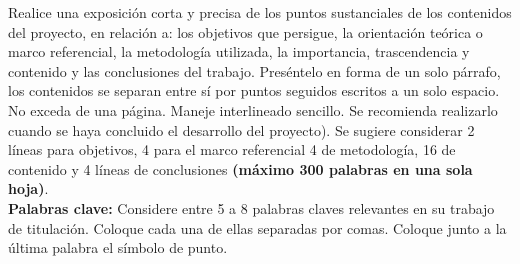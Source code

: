 \documentclass[12pt, a4paper, nofontenc, numbers=endperiod]{apa7}
\begin{document}
{			\setlength{\parindent}{0cm}\singlespacing Realice una exposición corta y precisa de los puntos sustanciales de los contenidos del proyecto, en relación a: los objetivos que persigue, la orientación teórica o marco referencial, la metodología utilizada, la importancia, trascendencia y contenido y las conclusiones del trabajo. Preséntelo en forma de un solo párrafo, los contenidos se separan entre sí por puntos seguidos escritos a un solo espacio. No exceda de una página. Maneje interlineado sencillo. Se recomienda realizarlo cuando se haya concluido el desarrollo del proyecto). Se sugiere considerar 2 líneas para objetivos, 4 para el marco referencial 4 de metodología, 16 de contenido y 4 líneas de conclusiones \textbf{(máximo 300 palabras en una sola hoja)}.\\
			
			\setlength{\parindent}{0cm}\textbf{Palabras clave:} Considere entre 5 a 8 palabras claves relevantes en su trabajo de titulación. Coloque cada una de ellas separadas por comas. Coloque junto a la última palabra el símbolo de punto.
			
		}
		\newpage
\end{document}
